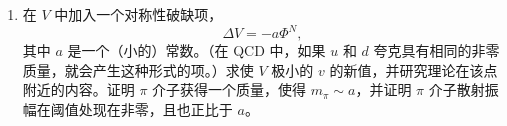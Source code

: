 \begin{enumerate}[label=(\alph*)]
    计算到 $\lambda$ 的领头阶，在质心系中，散射过程
    \begin{equation}
      \pi^1\pi^2 \to \pi^1\pi^2 .
    \end{equation}
    的微分散面 $d\sigma/d\Omega$。现在有四个费曼图有贡献。证明在阈值（$p^\mu = 0$）处，这些图之和为零。（\emph{提示}：先考虑具体过程 $\pi^1\pi^1\to\pi^2\pi^2$ 也许最容易，因为对该过程只有第一个和第四个图非零，然后再处理一般情形。）证明在特殊情形 $N=2$（1 种 $\pi$ 介子）下，$\mathcal{O}(p^2)$ 项也相消。
  \item 在 $V$ 中加入一个对称性破缺项，
    \begin{equation}
      \Delta V = -a\Phi^N ,
    \end{equation}
    其中 $a$ 是一个（小的）常数。（在 QCD 中，如果 $u$ 和 $d$ 夸克具有相同的非零质量，就会产生这种形式的项。）求使 $V$ 极小的 $v$ 的新值，并研究理论在该点附近的内容。证明 $\pi$ 介子获得一个质量，使得 $m_\pi \sim a$，并证明 $\pi$ 介子散射振幅在阈值处现在非零，且也正比于 $a$。
\end{enumerate}

